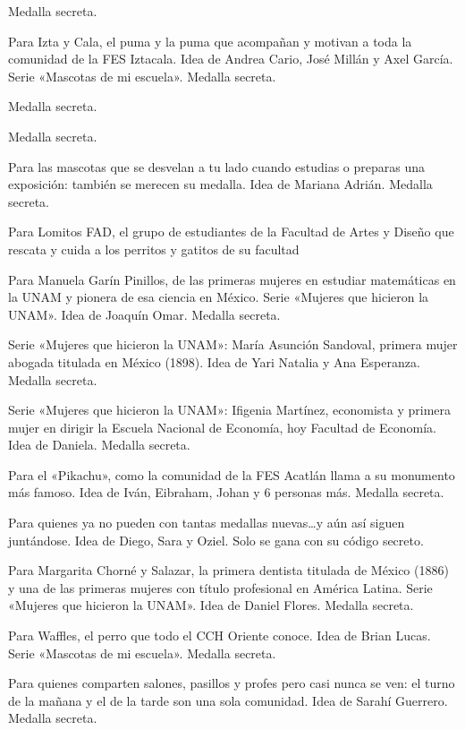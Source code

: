 \begin{description}[leftmargin=1.4cm, style=nextline]
  \item[H4LCON] Medalla secreta.
  \item[1ZT4YC4L4] Para Izta y Cala, el puma y la puma que acompañan y motivan a toda la comunidad de la FES Iztacala. Idea de Andrea Cario, José Millán y Axel García. Serie «Mascotas de mi escuela». Medalla secreta.
  \item[H0L4MD0] Medalla secreta.
  \item[H0L4WL] Medalla secreta.
  \item[GR4C1AZ] Para las mascotas que se desvelan a tu lado cuando estudias o preparas una exposición: también se merecen su medalla. Idea de Mariana Adrián. Medalla secreta.
  \item[L0M1T0] Para Lomitos FAD, el grupo de estudiantes de la Facultad de Artes y Diseño que rescata y cuida a los perritos y gatitos de su facultad
  \item[G4R1N] Para Manuela Garín Pinillos, de las primeras mujeres en estudiar matemáticas en la UNAM y pionera de esa ciencia en México. Serie «Mujeres que hicieron la UNAM». Idea de Joaquín Omar. Medalla secreta.
  \item[M4R1ASU] Serie «Mujeres que hicieron la UNAM»: María Asunción Sandoval, primera mujer abogada titulada en México (1898). Idea de Yari Natalia y Ana Esperanza. Medalla secreta.
  \item[1F1G3N1A] Serie «Mujeres que hicieron la UNAM»: Ifigenia Martínez, economista y primera mujer en dirigir la Escuela Nacional de Economía, hoy Facultad de Economía. Idea de Daniela. Medalla secreta.
  \item[P1K4CHU] Para el «Pikachu», como la comunidad de la FES Acatlán llama a su monumento más famoso. Idea de Iván, Eibraham, Johan y 6 personas más. Medalla secreta.
  \item[YAPORF4VOR] Para quienes ya no pueden con tantas medallas nuevas…y aún así siguen juntándose. Idea de Diego, Sara y Oziel. Solo se gana con su código secreto.
  \item[CH0RN3] Para Margarita Chorné y Salazar, la primera dentista titulada de México (1886) y una de las primeras mujeres con título profesional en América Latina. Serie «Mujeres que hicieron la UNAM». Idea de Daniel Flores. Medalla secreta.
  \item[W4FFL3S] Para Waffles, el perro que todo el CCH Oriente conoce. Idea de Brian Lucas. Serie «Mascotas de mi escuela». Medalla secreta.
  \item[TURN0S] Para quienes comparten salones, pasillos y profes pero casi nunca se ven: el turno de la mañana y el de la tarde son una sola comunidad. Idea de Sarahí Guerrero. Medalla secreta.

\end{description}
